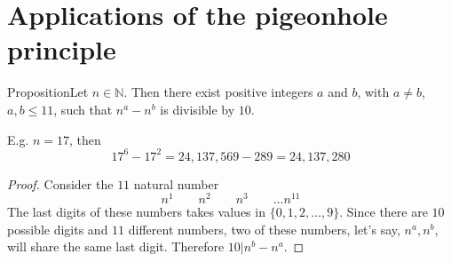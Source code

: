 \documentclass{beamer}
\def\bl[#1]#2{\begin{block}{#1}#2\end{block}}
\begin{document}
\section{Applications of the pigeonhole principle}

\begin{frame}
\bl[Proposition]{Let $n\in\mathbb{N}$. Then there exist positive integers $a$ and $b$, with $a\neq b$, $a,b\leq 11$, such that $n^a-n^b$ is divisible by $10$.}

E.g. $n=17$, then
\[
17^6-17^2=24,137,569-289=24,137,280
\]
\begin{proof}
Consider the $11$ natural number
\[
n^1\qquad n^2\qquad n^3\qquad \dots n^{11}
\]
The last digits of these numbers takes values in $\{0,1,2,\dots,9\}$. Since there are $10$ possible digits and $11$ different numbers, two of these numbers, let's say, $n^a,n^b$, will share the same last digit. Therefore $10|n^b-n^a$.
\end{proof}
\end{frame}
\end{document}
